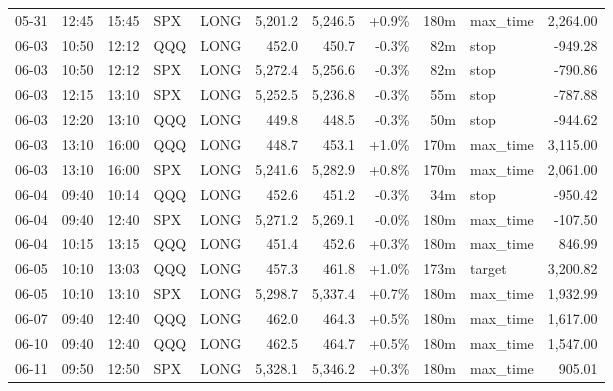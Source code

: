 \documentclass[11pt,a4paper,twoside]{article}
\begin{document}
\begin{center}
\begin{longtable}{>{\color{txtmain}}l l l l l r r r r >{\color{txtmain}}l r}
05-31 & 12:45 & 15:45 & SPX & LONG & 5,201.2 & 5,246.5 & \textcolor{wingreen}{+0.9\%} & 180m & max\_time & \textcolor{wingreen}{2,264.00} \\
06-03 & 10:50 & 12:12 & QQQ & LONG & 452.0 & 450.7 & \textcolor{lossred}{-0.3\%} & 82m & stop & \textcolor{lossred}{-949.28} \\
06-03 & 10:50 & 12:12 & SPX & LONG & 5,272.4 & 5,256.6 & \textcolor{lossred}{-0.3\%} & 82m & stop & \textcolor{lossred}{-790.86} \\
06-03 & 12:15 & 13:10 & SPX & LONG & 5,252.5 & 5,236.8 & \textcolor{lossred}{-0.3\%} & 55m & stop & \textcolor{lossred}{-787.88} \\
06-03 & 12:20 & 13:10 & QQQ & LONG & 449.8 & 448.5 & \textcolor{lossred}{-0.3\%} & 50m & stop & \textcolor{lossred}{-944.62} \\
06-03 & 13:10 & 16:00 & QQQ & LONG & 448.7 & 453.1 & \textcolor{wingreen}{+1.0\%} & 170m & max\_time & \textcolor{wingreen}{3,115.00} \\
06-03 & 13:10 & 16:00 & SPX & LONG & 5,241.6 & 5,282.9 & \textcolor{wingreen}{+0.8\%} & 170m & max\_time & \textcolor{wingreen}{2,061.00} \\
06-04 & 09:40 & 10:14 & QQQ & LONG & 452.6 & 451.2 & \textcolor{lossred}{-0.3\%} & 34m & stop & \textcolor{lossred}{-950.42} \\
06-04 & 09:40 & 12:40 & SPX & LONG & 5,271.2 & 5,269.1 & \textcolor{lossred}{-0.0\%} & 180m & max\_time & \textcolor{lossred}{-107.50} \\
06-04 & 10:15 & 13:15 & QQQ & LONG & 451.4 & 452.6 & \textcolor{wingreen}{+0.3\%} & 180m & max\_time & \textcolor{wingreen}{846.99} \\
06-05 & 10:10 & 13:03 & QQQ & LONG & 457.3 & 461.8 & \textcolor{wingreen}{+1.0\%} & 173m & target & \textcolor{wingreen}{3,200.82} \\
06-05 & 10:10 & 13:10 & SPX & LONG & 5,298.7 & 5,337.4 & \textcolor{wingreen}{+0.7\%} & 180m & max\_time & \textcolor{wingreen}{1,932.99} \\
06-07 & 09:40 & 12:40 & QQQ & LONG & 462.0 & 464.3 & \textcolor{wingreen}{+0.5\%} & 180m & max\_time & \textcolor{wingreen}{1,617.00} \\
06-10 & 09:40 & 12:40 & QQQ & LONG & 462.5 & 464.7 & \textcolor{wingreen}{+0.5\%} & 180m & max\_time & \textcolor{wingreen}{1,547.00} \\
06-11 & 09:50 & 12:50 & SPX & LONG & 5,328.1 & 5,346.2 & \textcolor{wingreen}{+0.3\%} & 180m & max\_time & \textcolor{wingreen}{905.01} \\

\end{longtable}
\end{center}
\end{document}
